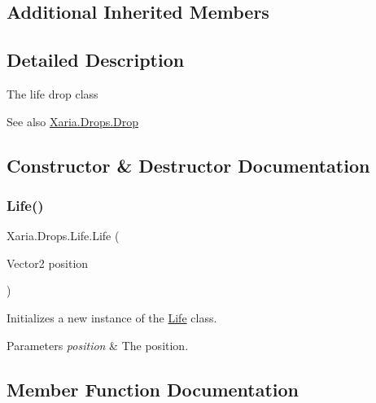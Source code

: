 \subsection*{Additional Inherited Members}


\subsection{Detailed Description}
The life drop class 

\begin{DoxySeeAlso}{See also}
\hyperlink{classXaria_1_1Drops_1_1Drop}{Xaria.\+Drops.\+Drop}


\end{DoxySeeAlso}


\subsection{Constructor \& Destructor Documentation}
\mbox{\label{classXaria_1_1Drops_1_1Life_a9d3dbca67913d57d966097f50bb748af}} 
\subsubsection{\texorpdfstring{Life()}{Life()}}
{\footnotesize\ttfamily Xaria.\+Drops.\+Life.\+Life (\begin{DoxyParamCaption}\item[{Vector2}]{position }\end{DoxyParamCaption})\hspace{0.3cm}{\ttfamily [inline]}}



Initializes a new instance of the \hyperlink{classXaria_1_1Drops_1_1Life}{Life} class. 


\begin{DoxyParams}{Parameters}
{\em position} & The position.\\
\hline
\end{DoxyParams}


\subsection{Member Function Documentation}
\mbox{\label{classXaria_1_1Drops_1_1Life_a17d0f9af39944213da726d821a46555b}} 
